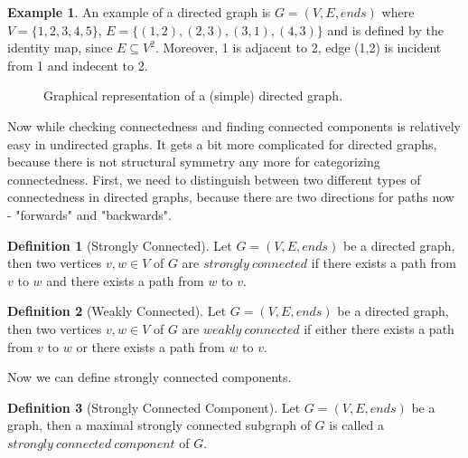 \documentclass{report}
\theoremstyle{plain}
\theoremstyle{definition}
\newtheorem{definition}{Definition}
\newtheorem{example}{Example}
\theoremstyle{remark}
\numberwithin{definition}{chapter}
\numberwithin{example}{chapter}
\numberwithin{figure}{chapter}
\begin{document}
\begin{example}
An example of a directed graph is $G=(V, E, ends)$ where $V=\{1,2,3,4,5\}$, $E=\{(1,2), (2,3), (3,1), (4,3)\}$ and is defined by the identity map, since $E \subseteq V^2$. Moreover, 1 is adjacent to 2, edge (1,2) is incident from 1 and indecent to 2.

\begin{figure}[h]
\center
{}
\caption{Graphical representation of a (simple) directed graph.}
\end{figure}
\end{example}

Now while checking connectedness and finding connected components is relatively easy in undirected graphs. It gets a bit more complicated for directed graphs, because there is not structural symmetry any more for categorizing connectedness. First, we need to distinguish between two different types of connectedness in directed graphs, because there are two directions for paths now - "forwards" and "backwards".

\begin{definition}[Strongly Connected]
Let $G = (V, E, ends)$ be a directed graph, then two vertices $v, w \in V$ of $G$ are $strongly \ connected$ if there exists a path from $v$ to $w$ and there exists a path from $w$ to $v$.
\end{definition}

\begin{definition}[Weakly Connected]
Let $G = (V, E, ends)$ be a directed graph, then two vertices $v, w \in V$ of $G$ are $weakly \ connected$ if either there exists a path from $v$ to $w$ or there exists a path from $w$ to $v$.
\end{definition}

Now we can define strongly connected components.

\begin{definition}[Strongly Connected Component]
Let $G = (V, E, ends)$ be a graph, then a maximal strongly connected subgraph of $G$ is called a $strongly \ connected \ component$ of $G$.
\end{definition}
\end{document}
